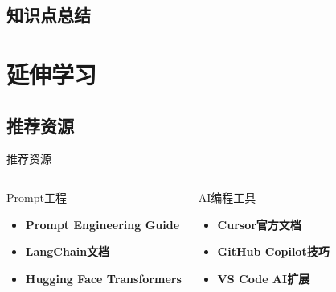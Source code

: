 \documentclass[aspectratio=169, 10pt]{beamer}
\begin{document}
\subsection{知识点总结}


\section{延伸学习}
\subsection{推荐资源}
\begin{frame}{推荐资源}
	\begin{columns}
		\begin{block}{Prompt工程}
			\begin{itemize}
				\item \textbf{Prompt Engineering Guide}
				\item \textbf{LangChain文档}
				\item \textbf{Hugging Face Transformers}
			\end{itemize}
		\end{block}

		\begin{block}{AI编程工具}
			\begin{itemize}
				\item \textbf{Cursor官方文档}
				\item \textbf{GitHub Copilot技巧}
				\item \textbf{VS Code AI扩展}
			\end{itemize}
		\end{block}
	\end{columns}
\end{frame}
\end{document}

